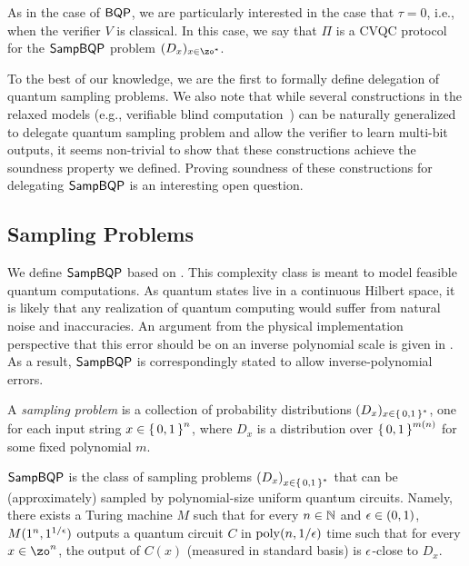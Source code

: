 As in the case of $\operatorname{\mathsf{BQP}}$, we are particularly interested in the case that $\tau = 0$, i.e., when the verifier $V$ is classical. In this case, we say that $\Pi$ is a CVQC protocol for the $\SampBQP$ problem $(D_x)_{x\in\zo^*}$.

To the best of our knowledge, we are the first to formally define delegation of quantum sampling problems. We also note that while several constructions in the relaxed models (e.g., verifiable blind computation~\cite{FK17}) can be naturally generalized to delegate quantum sampling problem and allow the verifier to learn multi-bit outputs, it seems non-trivial to show that these constructions achieve the soundness property we defined. Proving soundness of these constructions for delegating $\SampBQP$ is an interesting open question.

\iffalse
\subsection{Sampling Problems}

We define $\SampBQP$ based on \cite{aaronson_2013, aaronson_arkhipov_2011}.
This complexity class is meant to model feasible quantum computations.
As quantum states live in a continuous Hilbert space,
it is likely that any realization of quantum computing would suffer from natural noise and inaccuracies.
An argument from the physical implementation perspective that this error should be on an inverse polynomial scale is given in \cite{aaronson_arkhipov_2011}.
As a result, $\SampBQP$ is correspondingly stated to allow inverse-polynomial errors.

\begin{definition} 
    \label{dfn:sampling-problem}
    A \emph{sampling problem} is a collection of probability distributions $(D_x)_{x\in\set{0, 1}^*}$, one for each input string $x\in\set{0,1}^n$, where $D_x$ is a distribution over $\set{0,1}^{m(n)}$ for some fixed polynomial $m$.
\end{definition}

\begin{definition} [$\SampBQP$]
    $\SampBQP$ is the class of sampling problems $\left(D_x\right)_{x\in\set{0, 1}^*}$ that can be (approximately) sampled by polynomial-size uniform quantum circuits. Namely, there exists a Turing machine $M$ such that for every $n \in \mathbb{N}$ and $\epsilon \in (0,1)$, $M(1^n, 1^{1/\epsilon})$ outputs a quantum circuit $C$ in $\operatorname*{\operatorname{poly}}(n, 1/\epsilon)$ time such that for every $x \in \zo^n$, the output of $C(x)$ (measured in standard basis) is $\epsilon$-close to $D_x$.
\end{definition}





